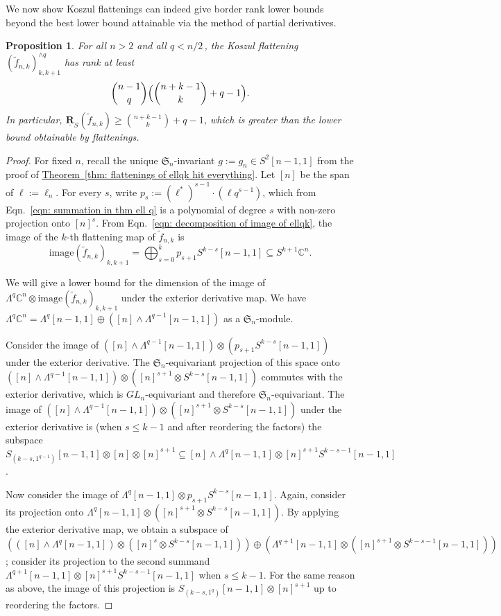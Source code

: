\documentclass[11pt]{article}
\numberwithin{equation}{section}
\newtheorem{proposition}[theorem]{Proposition}
\theoremstyle{definition}
\theoremstyle{plain}
\newcommand{\expref}[2]{\hyperref[#2]{#1~\ref{#2}}}
\newcommand{\bbC}{\mathbb{C}}
\newcommand{\frakS}{\mathfrak{S}}
\renewcommand{\tilde}[1]{\widetilde{#1}}
\def\ww{\wedge}
\def\La#1{\Lambda^{#1}}
\def\tim{\mathrm{image}}
\def\ur{\underline {\mathbf R}}
\begin{document}
We now show Koszul flattenings can indeed give border rank lower bounds beyond the best lower bound attainable via the method of partial derivatives. 

\begin{proposition}\label{fknkosz}  For all $n > 2$ and all $q < {n}/{2}$\,, the Koszul flattening $(\tilde f_{n,k})_{k,k+1}^{\ww q}$ has rank at least
$$
\binom{n-1}q \Bigl(\binom{n+k-1}{k} +  q-1   \Bigr).
$$
In particular, $\ur_S(\tilde f_{n,k})\geq \binom{n+k-1}{k} +q-1$, which is greater than the lower bound obtainable by flattenings.
\end{proposition} 
\begin{proof}
  For fixed $n$, recall the unique $\frakS_n$-invariant $g := g_n \in S^2 [n-1,1]$ from the proof of \expref{Theorem}{thm: flattenings of ellqk hit everything}. Let $[n]$ be the span of $\ell:= \ell_n$.  For every $s$, write $p_s := (\ell^*)^{s-1} \cdot (\ell q^{s-1})$,  which from Eqn.~\eqref{eqn: summation in thm ell q} is a polynomial of degree $s$ with non-zero projection onto $[n]^s$. {}From Eqn.~\eqref{eqn: decomposition of image of ellqk}, the image of the $k$-th flattening map of $\tilde{f}_{n,k}$ is
  \[
    \tim (\tilde{f}_{n,k})_{k,k+1} = \bigoplus_{s=0}^k p_{s+1}S^{k-s}[n-1,1] \subseteq S^{k+1} \bbC^n.
    \]

We will give a lower bound for the dimension of the image of $ \Lambda^q \bbC^n \otimes \tim (\tilde{f}_{n,k})_{k,k+1}$ under the exterior
derivative map. We have $\Lambda^q \bbC^n = \Lambda^{q} [n-1,1] \oplus \left( [n] \wedge \Lambda^{q-1} [n-1,1] \right)$ as a $\frakS_n$-module.

Consider the image of $( [n]\ww \La{q-1}[n-1,1]) \otimes (p_{s+1}S^{k-s}[n-1,1])$ under the exterior derivative. The $\frakS_n$-equivariant projection of this space onto $( [n]\ww \La{q-1}[n-1,1]) \otimes ([n]^{s+1} \otimes S^{k-s}[n-1,1])$ commutes with the exterior derivative, which is $GL_n$-equivariant and therefore $\frakS_n$-equivariant. The image of $( [n]\ww \La{q-1}[n-1,1]) \otimes ([n]^{s+1} \otimes S^{k-s}[n-1,1])$ under the exterior derivative is (when $s\leq k-1$ and after reordering the factors) the subspace $S_{(k-s,1^{q-1})}[n-1,1]\otimes [n]\otimes [n]^{s+1} \subseteq [n]\ww \La q[n-1,1]\otimes [n]^{s+1}S^{k-s-1}[n-1,1]$.

Now consider the image of $\La{q }[n-1,1] \otimes p_{s+1}S^{k-s}[n-1,1]$. Again, consider its projection onto $\Lambda^q [n-1,1] \otimes ([n]^{s+1} \otimes S^{k-s}[n-1,1])$. By applying the exterior derivative map, we obtain a subspace of $\left(([n] \wedge \Lambda^q [n-1,1]) \otimes ([n]^{s} \otimes S^{k-s} [n-1,1])\right)\oplus  \left(\La{q+1}[n-1,1]\otimes ([n]^{s+1} \otimes S^{k-s-1}[n-1,1] )\right)$; consider its projection to the second summand $  \La {q+1}[n-1,1]\otimes [n]^{s+1}S^{k-s-1}[n-1,1]$ when $s\leq k-1$. For the same reason as above,  the image of this projection is $S_{(k-s,1^{q })}[n-1,1]\otimes [n]^{s+1}$ up to reordering the factors.


\end{proof}
\end{document}

